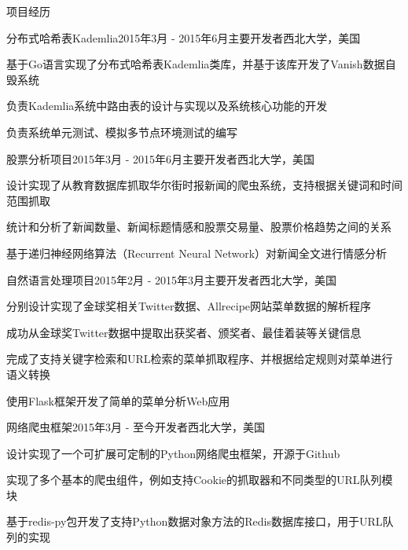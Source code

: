 \documentclass{resume} %
\begin{document}
\begin{rSection}{项目经历}

\begin{rSubsection}{分布式哈希表Kademlia}{2015年3月 - 2015年6月}{主要开发者}{西北大学，美国}
\item 基于Go语言实现了分布式哈希表Kademlia类库，并基于该库开发了Vanish数据自毁系统
\item 负责Kademlia系统中路由表的设计与实现以及系统核心功能的开发
\item 负责系统单元测试、模拟多节点环境测试的编写
\end{rSubsection}

\begin{rSubsection}{股票分析项目}{2015年3月 - 2015年6月}{主要开发者}{西北大学，美国}
\item 设计实现了从教育数据库抓取华尔街时报新闻的爬虫系统，支持根据关键词和时间范围抓取
\item 统计和分析了新闻数量、新闻标题情感和股票交易量、股票价格趋势之间的关系
\item 基于递归神经网络算法（Recurrent Neural Network）对新闻全文进行情感分析
\end{rSubsection}

\begin{rSubsection}{自然语言处理项目}{2015年2月 - 2015年3月}{主要开发者}{西北大学，美国}
\item 分别设计实现了金球奖相关Twitter数据、Allrecipe网站菜单数据的解析程序
\item 成功从金球奖Twitter数据中提取出获奖者、颁奖者、最佳着装等关键信息
\item 完成了支持关键字检索和URL检索的菜单抓取程序、并根据给定规则对菜单进行语义转换
\item 使用Flask框架开发了简单的菜单分析Web应用
\end{rSubsection}

\begin{rSubsection}{网络爬虫框架}{2015年3月 - 至今}{开发者}{西北大学，美国}
\item 设计实现了一个可扩展可定制的Python网络爬虫框架，开源于Github
\item 实现了多个基本的爬虫组件，例如支持Cookie的抓取器和不同类型的URL队列模块
\item 基于redis-py包开发了支持Python数据对象方法的Redis数据库接口，用于URL队列的实现
\end{rSubsection}

\end{rSection}

\end{document}
